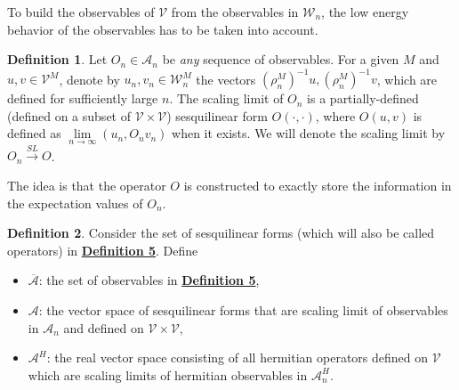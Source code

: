 \documentclass[twoside,11pt,titlepage]{amsart}
\renewcommand{\=}[1]{\stackrel{#1}{=}} %
\theoremstyle{definition}
\newtheorem{dfn}{Definition}
\theoremstyle{remark}
\begin{document}
To build the observables of $\mathcal{V}$ from the observables in $\mathcal{W}_n$, the low energy behavior of the observables has to be taken into account.
\begin{dfn}\label{dfn5}
Let $O_n \in \mathcal{A}_n$ be \textit{any} sequence of observables. For a given $M$ and $u,v \in \mathcal{V}^M$, denote by $u_n,v_n \in \mathcal{W}_n^M$ the vectors $(\rho_n^M)^{-1}u,(\rho_n^M)^{-1}v$, which are defined for sufficiently large $n$. The scaling limit of $O_n$ is a partially-defined (defined on a subset of $\mathcal{V} \times \mathcal{V}$) sesquilinear form $O(\cdot,\cdot)$, where $O(u,v)$ is defined as $\lim\limits_{n \to \infty}(u_n,O_nv_n)$ when it exists. We will denote the scaling limit by $O_n \xrightarrow{SL} O$.
\end{dfn}
The idea is that the operator $O$ is constructed to exactly store the information in the expectation values of $O_n$.
\begin{dfn}\label{dfn6}
Consider the set of sesquilinear forms (which will also be called operators) in \hyperref[dfn5]{\textbf{Definition 5}}. Define
\begin{itemize}
    \item $\overline{\mathcal{A}}$: the set of observables in \hyperref[dfn5]{\textbf{Definition 5}},
    \item $\mathcal{A}$: the vector space of sesquilinear forms that are scaling limit of observables in $\mathcal{A}_n$ and defined on $\mathcal{V}\times\mathcal{V}$,
    \item $\mathcal{A}^H$: the real vector space consisting of all hermitian operators defined on $\mathcal{V}$ which are scaling limits of hermitian observables in $\mathcal{A}_n^H$.
\end{itemize}
\end{dfn}
\end{document}
